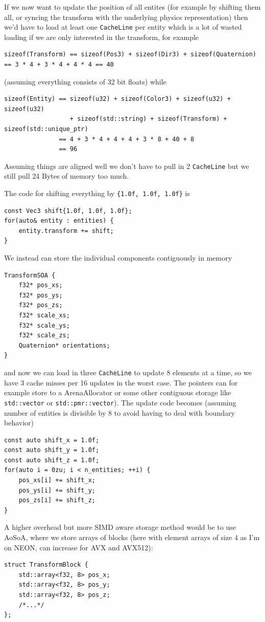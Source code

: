 \documentclass{article}
\begin{document}
If we now want to update the position of all entites (for example by shifting them all, or syncing the transform with the underlying physics representation) then we'd have to load at least one \texttt{CacheLine} per entity which is a lot of wasted loading if we are only interested in the transform, for example
\begin{lstlisting}
sizeof(Transform) == sizeof(Pos3) + sizeof(Dir3) + sizeof(Quaternion) == 3 * 4 + 3 * 4 + 4 * 4 == 40
\end{lstlisting}
(assuming everything consists of 32 bit floats) while
\begin{lstlisting}
sizeof(Entity) == sizeof(u32) + sizeof(Color3) + sizeof(u32) + sizeof(u32)
                  + sizeof(std::string) + sizeof(Transform) + sizeof(std::unique_ptr)
               == 4 + 3 * 4 + 4 + 4 + 3 * 8 + 40 + 8
               == 96
\end{lstlisting}
Assuming things are aligned well we don't have to pull in 2 \texttt{CacheLine} but we still pull 24 Bytes of memory too much.

The code for shifting everything by \texttt{\{1.0f, 1.0f, 1.0f\}} is
\begin{lstlisting}
const Vec3 shift{1.0f, 1.0f, 1.0f};
for(auto& entity : entities) {
    entity.transform += shift;
}
\end{lstlisting}

We instead can store the individual components contiguously in memory
\begin{lstlisting}
TransformSOA {
    f32* pos_xs;
    f32* pos_ys;
    f32* pos_zs;
    f32* scale_xs;
    f32* scale_ys;
    f32* scale_zs;
    Quaternion* orientations;
}
\end{lstlisting}
and now we can load in three \texttt{CacheLine} to update 8 elements at a time, so we have 3 cache misses per 16 updates in the worst case. The pointers can for example store to a ArenaAllocator or some other contiguous storage like \texttt{std::vector} or \texttt{std::pmr::vector}). The update code becomes (assuming number of entities is divisible by 8 to avoid having to deal with boundary behavior)
\begin{lstlisting}
const auto shift_x = 1.0f;
const auto shift_y = 1.0f;
const auto shift_z = 1.0f;
for(auto i = 0zu; i < n_entities; ++i) {
    pos_xs[i] += shift_x;
    pos_ys[i] += shift_y;
    pos_zs[i] += shift_z;
}
\end{lstlisting}

A higher overhead but more SIMD aware storage method would be to use AoSoA, where we store arrays of blocks (here with element arrays of size 4 as I'm on NEON, can increase for AVX and AVX512):
\begin{lstlisting}
struct TransformBlock {
    std::array<f32, 8> pos_x;
    std::array<f32, 8> pos_y;
    std::array<f32, 8> pos_z;
    /*...*/
};
\end{lstlisting}
\end{document}
